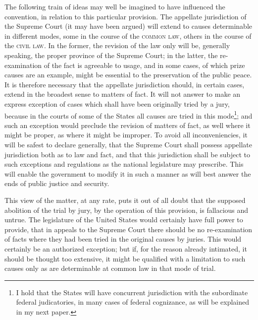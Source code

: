 The following train of ideas may well be imagined to have influenced the convention, in relation to this particular provision. 
The appellate jurisdiction of the Supreme Court (it may have been argued) will extend to causes determinable in different modes, some in the course of the \textsc{common law}, others in the course of the \textsc{civil law}. 
In the former, the revision of the law only will be, generally speaking, the proper province of the Supreme Court; in the latter, the re-examination of the fact is agreeable to usage, and in some cases, of which prize causes are an example, might be essential to the preservation of the public peace. 
It is therefore necessary that the appellate jurisdiction should, in certain cases, extend in the broadest sense to matters of fact. 
It will not answer to make an express exception of cases which shall have been originally tried by a jury, because in the courts of some of the States all causes are tried in this mode\footnote{I hold that the States will have concurrent jurisdiction with the subordinate federal judicatories, in many cases of federal cognizance, as will be explained in my next paper.}; and such an exception would preclude the revision of matters of fact, as well where it might be proper, as where it might be improper. 
To avoid all inconveniencies, it will be safest to declare generally, that the Supreme Court shall possess appellate jurisdiction both as to law and fact, and that this jurisdiction shall be subject to such exceptions and regulations as the national legislature may prescribe. 
This will enable the government to modify it in such a manner as will best answer the ends of public justice and security.

This view of the matter, at any rate, puts it out of all doubt that the supposed abolition of the trial by jury, by the operation of this provision, is fallacious and untrue. 
The legislature of the United States would certainly have full power to provide, that in appeals to the Supreme Court there should be no re-examination of facts where they had been tried in the original causes by juries. 
This would certainly be an authorized exception; but if, for the reason already intimated, it should be thought too extensive, it might be qualified with a limitation to such causes only as are determinable at common law in that mode of trial.

